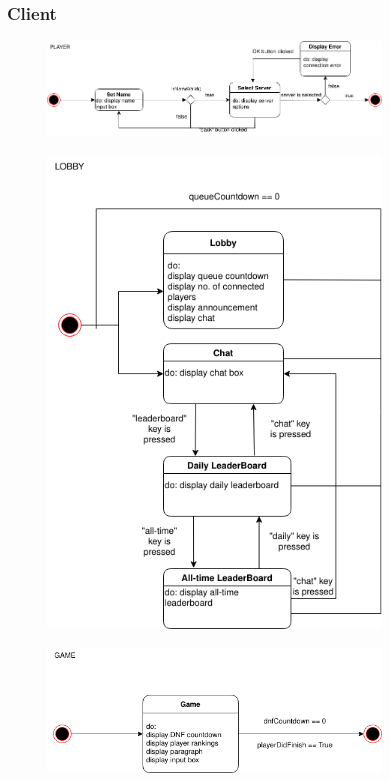 \documentclass{article}
\begin{document}
\subsubsection{Client}

\begin{figure}[h]
	\centering
	\includegraphics[width=0.79\textwidth]{state_diagram_player.png}
\end{figure}

\begin{figure}[h]
	\centering
	\includegraphics[width=0.79\textwidth]{state_diagram_lobby.png}
\end{figure}

\begin{figure}[h]
	\centering
	\includegraphics[width=0.79\textwidth]{state_diagram_game.png}
\end{figure}
\end{document}
